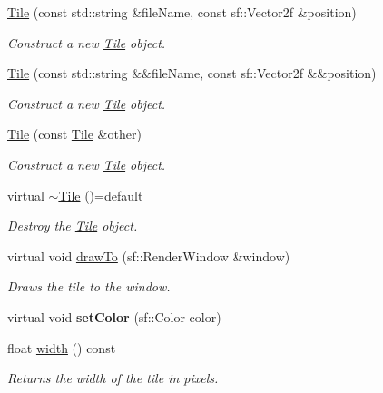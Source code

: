 \begin{DoxyCompactItemize}
\item 
\mbox{\hyperlink{classRose_1_1Tile_aa56994a706f8b5f5468d7fa7c9820346}{Tile}} (const std\+::string \&file\+Name, const sf\+::\+Vector2f \&position)
\begin{DoxyCompactList}\small\item\em Construct a new \mbox{\hyperlink{classRose_1_1Tile}{Tile}} object. \end{DoxyCompactList}\item 
\mbox{\hyperlink{classRose_1_1Tile_a6583b7a8d50b38d972865eb3440251fc}{Tile}} (const std\+::string \&\&file\+Name, const sf\+::\+Vector2f \&\&position)
\begin{DoxyCompactList}\small\item\em Construct a new \mbox{\hyperlink{classRose_1_1Tile}{Tile}} object. \end{DoxyCompactList}\item 
\mbox{\hyperlink{classRose_1_1Tile_a480e50775203166df068f0cfc889d91b}{Tile}} (const \mbox{\hyperlink{classRose_1_1Tile}{Tile}} \&other)
\begin{DoxyCompactList}\small\item\em Construct a new \mbox{\hyperlink{classRose_1_1Tile}{Tile}} object. \end{DoxyCompactList}\item 
virtual \mbox{\hyperlink{classRose_1_1Tile_a793bce7c8764240826df99058f7d8f32}{$\sim$\+Tile}} ()=default
\begin{DoxyCompactList}\small\item\em Destroy the \mbox{\hyperlink{classRose_1_1Tile}{Tile}} object. \end{DoxyCompactList}\item 
virtual void \mbox{\hyperlink{classRose_1_1Tile_ab83f64c1d7fdeba49f9d84bd1a33e612}{draw\+To}} (sf\+::\+Render\+Window \&window)
\begin{DoxyCompactList}\small\item\em Draws the tile to the window. \end{DoxyCompactList}\item 
\mbox{\label{classRose_1_1Tile_a76d736e6b459becc1b5ef124363dbe59}} 
virtual void {\bfseries set\+Color} (sf\+::\+Color color)
\item 
float \mbox{\hyperlink{classRose_1_1Tile_a819194106af71d48f48d0fedfcccc31e}{width}} () const
\begin{DoxyCompactList}\small\item\em Returns the width of the tile in pixels. \end{DoxyCompactList}\item 

\end{DoxyCompactItemize}
